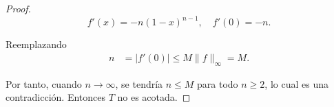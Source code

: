 \begin{enumerate}
\begin{sol}
\begin{proof}
$$
f'(x) = -n(1 - x)^{n - 1}, \quad f'(0) = -n.
$$

Reemplazando
\begin{align*}
n &= |f'(0)| \leq M \|f\|_\infty = M.
\end{align*}

Por tanto, cuando $n \to \infty$, se tendría $n \leq M$ para todo $n \geq 2$, lo cual es una contradicción. Entonces $T$ no es acotada.

\end{proof}
        
\end{sol}
\end{enumerate}


